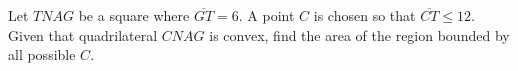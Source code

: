 Let $TNAG$ be a square where $\overline{GT}=6$. A point $C$ is chosen so that $\overline{CT}\leq 12$. Given that quadrilateral $CNAG$ is convex, find the area of the region bounded by all possible $C$.
